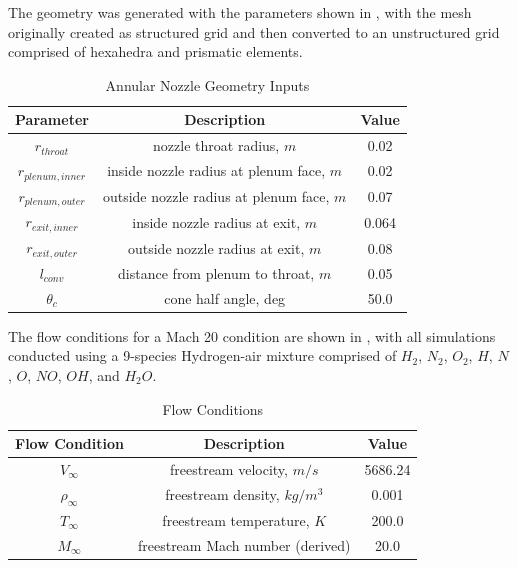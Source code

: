 The geometry was generated with the parameters shown in ,
with the mesh originally created as structured grid and then converted to an
unstructured grid comprised of hexahedra and prismatic elements.
\begin{table}[h]
  \centering
  \begin{tabular}{c|c|c}
    Parameter & Description & Value \\
    \hline
    $r_{throat}$       &   nozzle throat radius, $m$                 & 0.02 \\
    $r_{plenum,inner}$ &   inside nozzle radius at plenum face, $m$  & 0.02 \\
    $r_{plenum,outer}$ &   outside nozzle radius at plenum face, $m$ & 0.07 \\
    $r_{exit,inner}$   &   inside nozzle radius at exit, $m$         & 0.064 \\
    $r_{exit,outer}$   &   outside nozzle radius at exit, $m$        & 0.08 \\
    $l_{conv}$         &   distance from plenum to throat, $m$       & 0.05 \\
    $\theta_c$         &   cone half angle, deg                      & 50.0
  \end{tabular}
  \caption{Annular Nozzle Geometry Inputs}
  \label{tab:annular-geom}
\end{table}
The flow conditions for a Mach 20 condition are shown in
, with all simulations conducted using a 9-species
Hydrogen-air mixture comprised of $H_2$, $N_2$, $O_2$, $H$, $N$, $O$, $NO$,
$OH$, and $H_2 O$.
\begin{table}[!h]
  \centering
  \begin{tabular}{c|c|c}
    Flow Condition & Description & Value \\
    \hline
    $V_{\infty}$    & freestream velocity, $m/s$        & 5686.24 \\
    $\rho_{\infty}$ & freestream density, $kg/m^3$      & 0.001 \\
    $T_{\infty}$    & freestream temperature, $K$       & 200.0 \\
    $M_{\infty}$    & freestream Mach number (derived)  & 20.0
  \end{tabular}
  \caption{Flow Conditions}
  \label{tab:flow-conditions}
\end{table}


